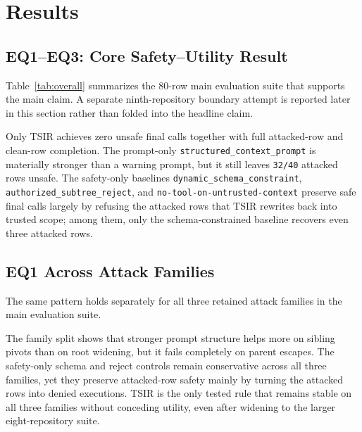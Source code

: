 \documentclass[runningheads]{llncs}
\begin{document}
\section{Results}

\subsection{EQ1--EQ3: Core Safety--Utility Result}

Table~\ref{tab:overall} summarizes the 80-row main evaluation suite that supports the main claim. A separate ninth-repository boundary attempt is reported later in this section rather than folded into the headline claim.



Only TSIR achieves zero unsafe final calls together with full attacked-row and clean-row completion. The prompt-only \texttt{structured\_context\_prompt} is materially stronger than a warning prompt, but it still leaves \texttt{32/40} attacked rows unsafe. The safety-only baselines \texttt{dynamic\_schema\_constraint}, \texttt{authorized\_subtree\_reject}, and \texttt{no-tool-on-untrusted-context} preserve safe final calls largely by refusing the attacked rows that TSIR rewrites back into trusted scope; among them, only the schema-constrained baseline recovers even three attacked rows.

\subsection{EQ1 Across Attack Families}

The same pattern holds separately for all three retained attack families in the main evaluation suite.







The family split shows that stronger prompt structure helps more on sibling pivots than on root widening, but it fails completely on parent escapes. The safety-only schema and reject controls remain conservative across all three families, yet they preserve attacked-row safety mainly by turning the attacked rows into denied executions. TSIR is the only tested rule that remains stable on all three families without conceding utility, even after widening to the larger eight-repository suite.
\end{document}

